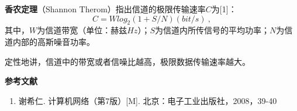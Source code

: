 

\textbf{香农定理}（Shannon Therom）指出信道的极限传输速率$C$为[1]：
\begin{equation}
C=Wlog_2(1+S/N)    (bit/s)~,
\end{equation}
其中，$W$为信道带宽（单位：赫兹$Hz$）；$S$为信道内所传信号的平均功率；$N$为信道内部的高斯噪音功率。

定性地讲，信道中的带宽或者信噪比越高，极限数据传输速率越大。


\textbf{参考文献}
\begin{enumerate}
\item 谢希仁. 计算机网络（第7版）[M]. 北京：电子工业出版社，2008，39-40
\end{enumerate}
